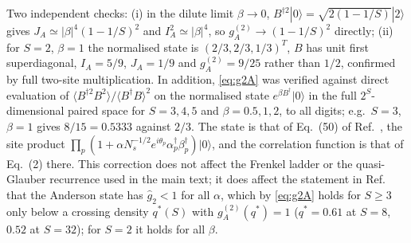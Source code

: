 \documentclass[11pt,a4paper]{article}
\newcommand{\ket}[1]{|#1\rangle}
\begin{document}
Two independent checks: (i) in the dilute limit $\beta\to0$, $B^{\dagger2}\ket0=\sqrt{2(1-1/S)}\ket2$ gives $J_A\simeq|\beta|^4(1-1/S)^2$ and $I_A^2\simeq|\beta|^4$, so $g^{(2)}_A\to(1-1/S)^2$ directly; (ii) for $S=2$, $\beta=1$ the normalised state is $(2/3,2/3,1/3)^T$, $B$ has unit first superdiagonal, $I_A=5/9$, $J_A=1/9$ and $g^{(2)}_A=9/25$ rather than $1/2$, confirmed by full two-site multiplication. In addition, \eqref{eq:g2A} was verified against direct evaluation of $\langle B^{\dagger2}B^2\rangle/\langle B^\dagger B\rangle^2$ on the normalised state $e^{\beta B^\dagger}\ket0$ in the full $2^S$-dimensional paired space for $S=3,4,5$ and $\beta=0.5,1,2$, to all digits; e.g.\ $S=3$, $\beta=1$ gives $8/15=0.5333$ against $2/3$. The state is that of Eq.~(50) of Ref.~\cite{Shiau2017}, the site product $\prod_p(1+\alpha N_s^{-1/2}e^{i\theta_p}\alpha_p^\dagger\beta_p^\dagger)\ket0$, and the correlation function is that of Eq.~(2) there. This correction does not affect the Frenkel ladder or the quasi-Glauber recurrence used in the main text; it does affect the statement in Ref.~\cite{Shiau2017} that the Anderson state has $\hat g_2<1$ for all $\alpha$, which by \eqref{eq:g2A} holds for $S\ge3$ only below a crossing density $q^*(S)$ with $g^{(2)}_A(q^*)=1$ ($q^*=0.61$ at $S=8$, $0.52$ at $S=32$); for $S=2$ it holds for all $\beta$.
\end{document}
